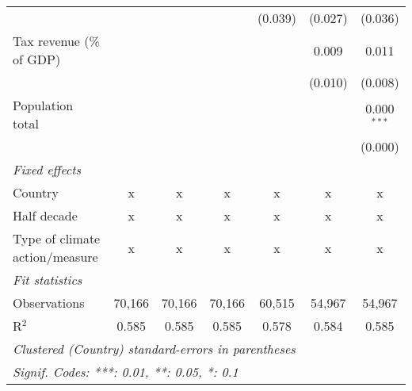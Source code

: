 \begin{tabular}{lcccccc}
                                                      &         &                &                & (0.039)        & (0.027)        & (0.036)\\   
   Tax revenue (\% of GDP)                            &         &                &                &                & 0.009          & 0.011\\   
                                                      &         &                &                &                & (0.010)        & (0.008)\\   
   Population total                                   &         &                &                &                &                & 0.000$^{***}$\\   
                                                      &         &                &                &                &                & (0.000)\\   
   \emph{Fixed effects}\\
   Country                                            & x       & x              & x              & x              & x              & x\\  
   Half decade                                        & x       & x              & x              & x              & x              & x\\  
   Type of climate action/measure                     & x       & x              & x              & x              & x              & x\\  
   \midrule \emph{Fit statistics}\\
   Observations                                       & 70,166  & 70,166         & 70,166         & 60,515         & 54,967         & 54,967\\  
   R$^2$                                              & 0.585   & 0.585          & 0.585          & 0.578          & 0.584          & 0.585\\  
   \midrule
   \multicolumn{7}{l}{\emph{Clustered (Country) standard-errors in parentheses}}\\
   \multicolumn{7}{l}{\emph{Signif. Codes: ***: 0.01, **: 0.05, *: 0.1}}\\
\end{tabular}
\par\endgroup



